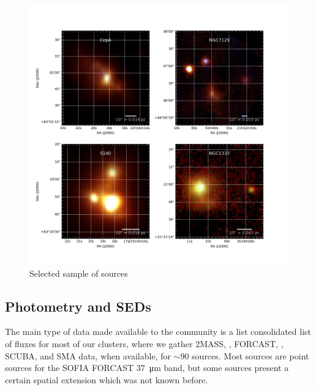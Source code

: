 \begin{figure}[!h]
\begin{center}
\includegraphics[width=\textwidth]{Figures/RGBmosaic.png}
\vspace{-1cm}
\caption[RGB images of select sample of sources]{Selected sample of sources}
\label{fig:varietySources}
\end{center}
\end{figure}

\subsection{Photometry and SEDs}

The main type of data made available to the community is a list consolidated list of fluxes for most of our clusters, where we gather 2MASS, \Spitzer, FORCAST, \Herschel, SCUBA, and SMA data, when available, for $\sim 90$ sources. Most sources are point sources for the SOFIA FORCAST \SI{37}{\um} band, but some sources present a certain spatial extension which was not known before. 


